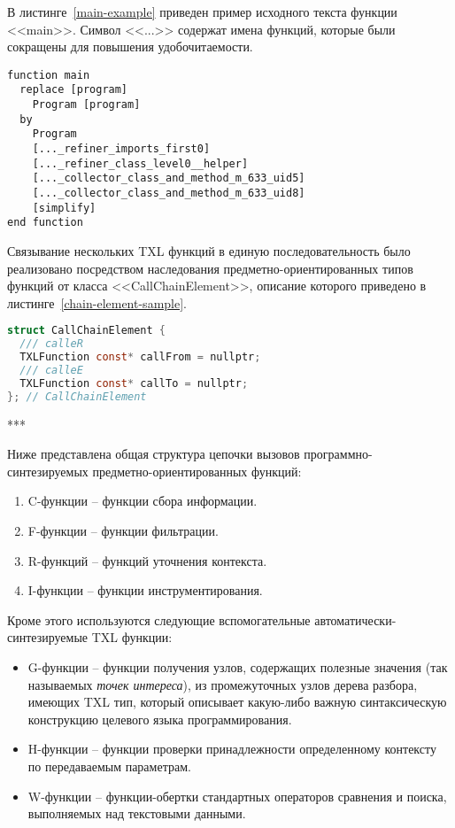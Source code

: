 В листинге~\ref{main-example} приведен пример исходного текста функции <<main>>.
Символ <<...>> содержат имена функций, которые были сокращены для повышения удобочитаемости.

\begin{lstlisting}[frame=single, language=TXL, label={main-example}, caption={Пример исходного текста главной функции.}]
function main
  replace [program]
    Program [program]
  by
    Program
    [..._refiner_imports_first0]
    [..._refiner_class_level0__helper]
    [..._collector_class_and_method_m_633_uid5]
    [..._collector_class_and_method_m_633_uid8]
    [simplify]
end function
\end{lstlisting}

Связывание нескольких TXL функций в единую последовательность было реализовано посредством наследования предметно-ориентированных типов функций от класса <<CallChainElement>>, описание которого приведено в листинге~\ref{chain-element-sample}.

\begin{lstlisting}[frame=single, language=C, label={chain-element-sample}, caption={Исходный код определения элемента цепочки вызовов.}]
struct CallChainElement {
  /// calleR
  TXLFunction const* callFrom = nullptr;
  /// calleE
  TXLFunction const* callTo = nullptr;
}; // CallChainElement
\end{lstlisting}

***

Ниже представлена общая структура цепочки вызовов программно-синтезируемых предметно-ориентированных функций:
\begin{enumerate}[noitemsep]
  \item C-функции -- функции сбора информации.
  \item F-функции -- функции фильтрации.
  \item R-функций -- функций уточнения контекста.
  \item I-функции -- функции инструментирования.
\end{enumerate}

Кроме этого используются следующие вспомогательные автоматически-синтезируемые TXL функции:
\begin{itemize}
  \item G-функции -- функции получения узлов, содержащих полезные значения (так называемых \textit{точек интереса}), из промежуточных узлов дерева разбора, имеющих TXL тип, который описывает какую-либо важную синтаксическую конструкцию целевого языка программирования.
  \item H-функции -- функции проверки принадлежности определенному контексту по передаваемым параметрам.
  \item W-функции -- функции-обертки стандартных операторов сравнения и поиска, выполняемых над текстовыми данными.
\end{itemize}

